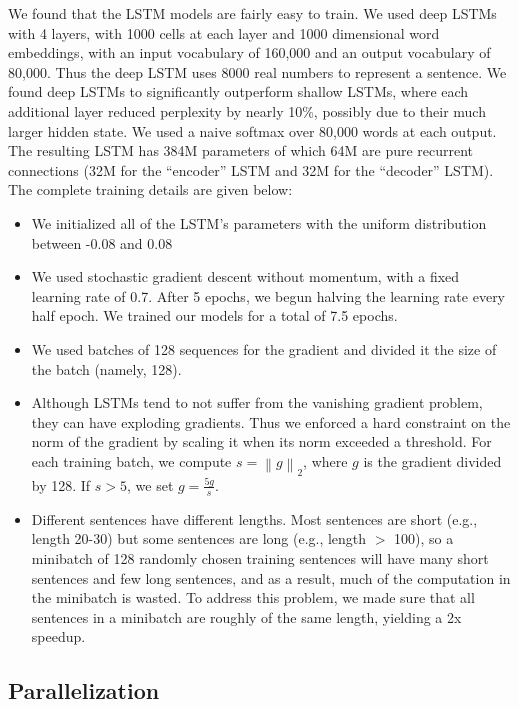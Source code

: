 We found that the LSTM models are fairly easy to train.  We used deep
LSTMs with 4 layers, with 1000 cells at each layer and 1000
dimensional word embeddings, with an input vocabulary of 160,000
and an output vocabulary of 80,000.  Thus the deep LSTM uses 8000 real 
numbers to represent a sentence. We found deep LSTMs to
significantly outperform shallow LSTMs, where each additional layer
reduced perplexity by nearly 10\%, possibly due to their much larger
hidden state.  We used a naive softmax over 80,000 words at each
output.  The resulting LSTM has 384M parameters of which 64M are pure
recurrent connections (32M for the ``encoder'' LSTM and 32M for the
``decoder'' LSTM). The complete training details are given below:
\begin{itemize}
\item We initialized all of the LSTM's parameters with the uniform distribution between
  -0.08 and 0.08
\item We used stochastic gradient descent without momentum,
  with a fixed learning rate of 0.7.  After 5 epochs, we begun
  halving the learning rate every half epoch.  We trained our models for a
  total of 7.5 epochs.
\item We used batches of 128 sequences for the gradient and divided it
  the size of the batch (namely, 128).
\item Although LSTMs tend to not suffer from the vanishing gradient
  problem, they can have exploding gradients.  Thus we enforced a hard
  constraint on the norm of the gradient
  \cite{graves13c,razvan} by scaling it when its norm exceeded
  a threshold. For each training batch, we compute $s =
  \left\|g\right\|_2$, where $g$ is the gradient divided by 128. If $s > 5$, we set
  $g = \frac{5g}{s}$.
\item Different sentences have different lengths.  Most sentences are
  short (e.g., length 20-30) but some sentences are long (e.g., length
  $>$ 100), so a minibatch of 128 randomly chosen training sentences
  will have many short sentences and few long sentences, and as a
  result, much of the computation in the minibatch is wasted.  To
  address this problem, we made sure that all sentences in a
  minibatch are roughly of the same length, yielding a 2x speedup.
\end{itemize}


\subsection{Parallelization}


